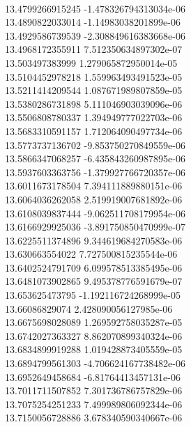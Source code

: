 { \\
13.4799266915245 -1.478326794313034e-06
 \\
13.4890822033014 -1.14983038201899e-06
 \\
13.4929586739539 -2.308849616383668e-06
 \\
13.4968172355911 7.512350634897302e-07
 \\
13.503497383999 1.279065872950014e-05
 \\
13.5104452978218 1.559963493491523e-05
 \\
13.5211414209544 1.087671989807859e-05
 \\
13.5380286731898 5.111046903039096e-06
 \\
13.5506808780337 1.394949777022703e-06
 \\
13.5683310591157 1.712064090497734e-06
 \\
13.5773737136702 -9.853750270849559e-06
 \\
13.5866347068257 -6.435843260987895e-06
 \\
13.5937603363756 -1.379927766720357e-06
 \\
13.6011673178504 7.394111889880151e-06
 \\
13.6064036262058 2.519919007681892e-06
 \\
13.6108039837444 -9.062511708179954e-06
 \\
13.6166929925036 -3.891750850470999e-07
 \\
13.6225511374896 9.344619684270583e-06
 \\
13.630663554022 7.727500815235544e-06
 \\
13.6402524791709 6.099578513385495e-06
 \\
13.6481073902865 9.495378776591679e-07
 \\
13.653625473795 -1.192116724268999e-05
 \\
13.66086829074 2.428090056127985e-06
 \\
13.6675698028089 1.269592758035287e-05
 \\
13.6742027363327 8.862070899340324e-06
 \\
13.6834899919288 1.019428873405559e-05
 \\
13.6894799561303 -4.706624167738482e-06
 \\
13.6952649458684 -6.81764413457131e-06
 \\
13.7011711507852 7.301736786757829e-06
 \\
13.7075254251233 7.499989806092344e-06
 \\
13.7150056728886 3.678340590340667e-06
 \\
}
